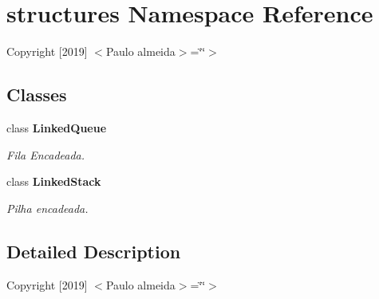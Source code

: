 \section{structures Namespace Reference}
\label{namespacestructures}


Copyright [2019] $<$\+Paulo almeida$>$=\char`\"{}\char`\"{}$>$  


\subsection*{Classes}
\begin{DoxyCompactItemize}
\item 
class \textbf{ Linked\+Queue}
\begin{DoxyCompactList}\small\item\em Fila Encadeada. \end{DoxyCompactList}\item 
class \textbf{ Linked\+Stack}
\begin{DoxyCompactList}\small\item\em Pilha encadeada. \end{DoxyCompactList}\end{DoxyCompactItemize}


\subsection{Detailed Description}
Copyright [2019] $<$\+Paulo almeida$>$=\char`\"{}\char`\"{}$>$ 